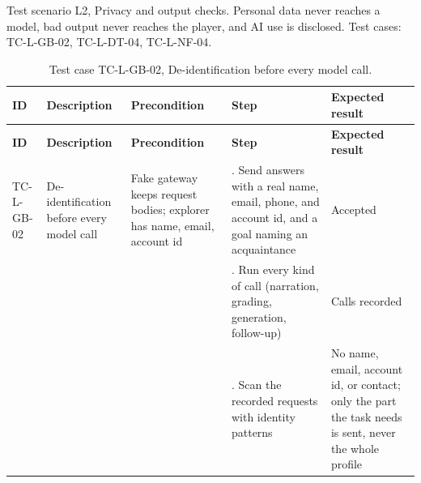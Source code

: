 Test scenario L2, Privacy and output checks. Personal data never reaches a model, bad output never reaches the player, and AI use is disclosed. Test cases: TC-L-GB-02, TC-L-DT-04, TC-L-NF-04.

{\small
\begin{longtable}{|>{\raggedright\arraybackslash}p{}|>{\raggedright\arraybackslash}p{}|>{\raggedright\arraybackslash}p{}|>{\raggedright\arraybackslash}p{}|>{\raggedright\arraybackslash}p{}|}
\caption{Test case TC-L-GB-02, De-identification before every model call.} \\
\hline
\textbf{ID} & \textbf{Description} & \textbf{Precondition} & \textbf{Step} & \textbf{Expected result} \\ \hline
\endfirsthead
\hline
\textbf{ID} & \textbf{Description} & \textbf{Precondition} & \textbf{Step} & \textbf{Expected result} \\ \hline
\endhead
TC-L-GB-02 & De-identification before every model call & Fake gateway keeps request bodies; explorer has name, email, account id & 1. Send answers with a real name, email, phone, and account id, and a goal naming an acquaintance & Accepted \\ \hline
 &  &  & 2. Run every kind of call (narration, grading, generation, follow-up) & Calls recorded \\ \hline
 &  &  & 3. Scan the recorded requests with identity patterns & No name, email, account id, or contact; only the part the task needs is sent, never the whole profile \\ \hline
\end{longtable}
}

